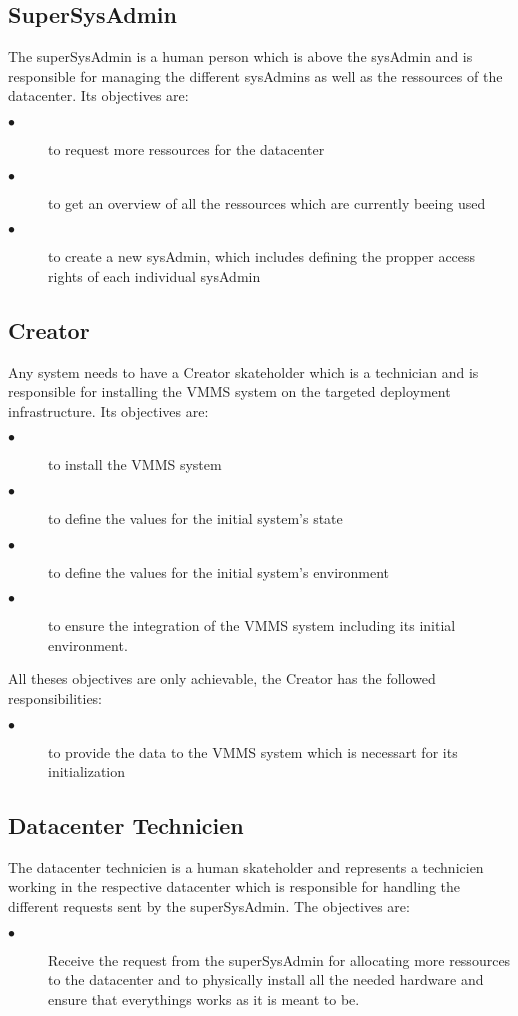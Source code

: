 \subsection{SuperSysAdmin}

The superSysAdmin is a human person which is above the sysAdmin and is
responsible for managing the different sysAdmins as well as the ressources of
the datacenter. Its objectives are:
\begin{description}
\item[$\bullet$] to request more ressources for the datacenter
\item[$\bullet$] to get an overview of all the ressources which are currently
beeing used
\item[$\bullet$] to create a new sysAdmin, which includes defining the propper
access rights of each individual sysAdmin
\end{description}
\subsection{Creator}

Any system needs to have a Creator skateholder which is a technician and is
responsible for installing the VMMS system on the targeted deployment
infrastructure. Its objectives are:
\begin{description}
\item[$\bullet$] to install the VMMS system
\item[$\bullet$] to define the values for the initial system's state
\item[$\bullet$] to define the values for the initial system's environment
\item[$\bullet$] to ensure the integration of the VMMS system including its
initial environment.
\end{description}
All theses objectives are only achievable, the Creator has the followed responsibilities:
\begin{description}
\item[$\bullet$] to provide the data to the VMMS system which is necessart for
its initialization
\end{description}
\subsection{Datacenter Technicien}

The datacenter technicien is a human skateholder and represents a technicien
working in the respective datacenter which is responsible for handling the
different requests sent by the superSysAdmin. The objectives are:
\begin{description}
\item[$\bullet$] Receive the request from the superSysAdmin for allocating more
ressources to the datacenter and to physically install all the needed hardware
and ensure that everythings works as it is meant to be.
\end{description}

